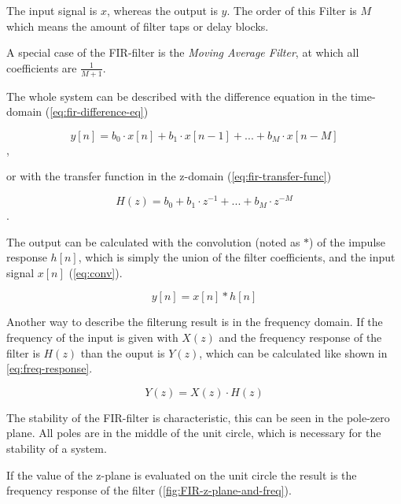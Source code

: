 The input signal is $x$, whereas the output is $y$. The order of this Filter is $M$ which means the amount of
filter taps or delay blocks.

A special case of the \ac{FIR}-filter is the \textit{Moving Average Filter}, at which all coefficients are $\frac{1}{M+1}$.

The whole system can be described with the difference equation in the time-domain (\autoref{eq:fir-difference-eq})

\begin{equation}
    y[n] = b_0 \cdot x[n] + b_1 \cdot x[n-1] + ... + b_M \cdot x[n-M]
    \label{eq:fir-difference-eq}
\end{equation},

or with the transfer function in the z-domain (\autoref{eq:fir-transfer-func})

\begin{equation}
    H(z) = b_0 + b_1 \cdot z^{-1} + ... + b_M \cdot z^{-M}
    \label{eq:fir-transfer-func}
\end{equation}.

The output can be calculated with the convolution (noted as $*$) of the impulse response $h[n]$, which is simply the
union of the filter coefficients, and the input signal $x[n]$ (\autoref{eq:conv}).

\begin{equation}
    y[n] = x[n] * h[n]
    \label{eq:conv}
\end{equation}

Another way to describe the filterung result is in the frequency domain.
If the frequency of the input is given with $X(z)$ and the frequency response of the filter is $H(z)$
than the ouput is $Y(z)$, which can be calculated like shown in \autoref{eq:freq-response}.

\begin{equation}
    Y(z) = X(z) \cdot H(z)
    \label{eq:freq-response}
\end{equation}

The stability of the \ac{FIR}-filter is characteristic, this can be seen in the pole-zero plane. All poles are in
the middle of the unit circle, which is necessary for the stability of a system.

If the value of the z-plane is evaluated on the unit circle the result is the frequency response of the filter
(\autoref{fig:FIR-z-plane-and-freq}).

